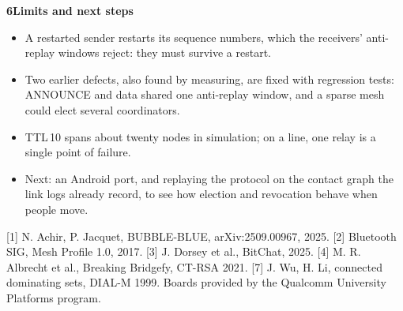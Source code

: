 \documentclass{article}
\newcommand{\sect}[1]{\par\vfill\vspace{8mm}%
  {\color{navy}\fontsize{46}{52}\selectfont\bfseries #1\par}%
  \vspace{2mm}{\color{accent}\rule{\linewidth}{1.2mm}}\par\vspace{2mm}}
\begin{document}
\begin{minipage}[t][935mm][t]{245mm}
\sect{6\enspace Limits and next steps}
\begin{itemize}
  \item A restarted sender restarts its sequence numbers, which the
        receivers' anti-replay windows reject: they must survive a
        restart.
  \item Two earlier defects, also found by measuring, are fixed with
        regression tests: ANNOUNCE and data shared one anti-replay
        window, and a sparse mesh could elect several coordinators.
  \item TTL\,10 spans about twenty nodes in simulation; on a line, one
        relay is a single point of failure.
  \item Next: an Android port, and replaying the protocol on the contact
        graph the link logs already record, to see how election and
        revocation behave when people move.
\end{itemize}

\vspace{6mm}
{\fontsize{16}{20}\selectfont\color{muted}
[1] N. Achir, P. Jacquet, BUBBLE-BLUE, arXiv:2509.00967, 2025.
[2] Bluetooth SIG, Mesh Profile 1.0, 2017.
[3] J. Dorsey et al., BitChat, 2025.
[4] M. R. Albrecht et al., Breaking Bridgefy, CT-RSA 2021.
[7] J. Wu, H. Li, connected dominating sets, DIAL-M 1999.
Boards provided by the Qualcomm University Platforms program.\par}
\end{minipage}
\end{document}
